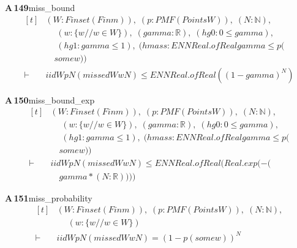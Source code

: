 \documentclass[conference]{IEEEtran}
\theoremstyle{definition}
\newcommand{\lean}[1]{\textsf{\footnotesize #1}}
\begin{document}
\noindent\textbf{A\,149}\quad\lean{miss\_bound}
{\footnotesize\[ \begin{aligned}[t]
&(\mathit{W} : \mathit{Finset} (\mathit{Fin} \mathit{m})),\; (\mathit{p} : \mathit{PMF} (\mathit{Points} \mathit{W})),\; (\mathit{N} : \mathbb{N} ),\\
&\quad \; (\mathit{w} : \{ \mathit{w} // \mathit{w} \in \mathit{W}\} ),\; (\mathit{gamma} : \mathbb{R} ),\; (\mathit{hg0} : 0 \leq \mathit{gamma}),\\
&\quad \; (\mathit{hg1} : \mathit{gamma} \leq 1),\; (\mathit{hmass} : \mathit{ENNReal}.\mathit{ofReal} \mathit{gamma} \leq \mathit{p} (\\
&\quad \mathit{some} \mathit{w}))\\
\vdash\;&\mathit{iid} \mathit{W} \mathit{p} \mathit{N} (\mathit{missed} \mathit{W} \mathit{w} \mathit{N}) \leq \mathit{ENNReal}.\mathit{ofReal} ((1-\mathit{gamma})^{\mathit{N}})
\end{aligned} \]}

\noindent\textbf{A\,150}\quad\lean{miss\_bound\_exp}
{\footnotesize\[ \begin{aligned}[t]
&(\mathit{W} : \mathit{Finset} (\mathit{Fin} \mathit{m})),\; (\mathit{p} : \mathit{PMF} (\mathit{Points} \mathit{W})),\; (\mathit{N} : \mathbb{N} ),\\
&\quad \; (\mathit{w} : \{ \mathit{w} // \mathit{w} \in \mathit{W}\} ),\; (\mathit{gamma} : \mathbb{R} ),\; (\mathit{hg0} : 0 \leq \mathit{gamma}),\\
&\quad \; (\mathit{hg1} : \mathit{gamma} \leq 1),\; (\mathit{hmass} : \mathit{ENNReal}.\mathit{ofReal} \mathit{gamma} \leq \mathit{p} (\\
&\quad \mathit{some} \mathit{w}))\\
\vdash\;&\mathit{iid} \mathit{W} \mathit{p} \mathit{N} (\mathit{missed} \mathit{W} \mathit{w} \mathit{N}) \leq \mathit{ENNReal}.\mathit{ofReal} (\mathit{Real}.\mathit{exp} (-(\\
&\quad \mathit{gamma}*(\mathit{N}:\mathbb{R} ))))
\end{aligned} \]}

\noindent\textbf{A\,151}\quad\lean{miss\_probability}
{\footnotesize\[ \begin{aligned}[t]
&(\mathit{W} : \mathit{Finset} (\mathit{Fin} \mathit{m})),\; (\mathit{p} : \mathit{PMF} (\mathit{Points} \mathit{W})),\; (\mathit{N} : \mathbb{N} ),\\
&\quad \; (\mathit{w} : \{ \mathit{w} // \mathit{w} \in \mathit{W}\} )\\
\vdash\;&\mathit{iid} \mathit{W} \mathit{p} \mathit{N} (\mathit{missed} \mathit{W} \mathit{w} \mathit{N}) = (1 - \mathit{p} (\mathit{some} \mathit{w}))^{\mathit{N}}
\end{aligned} \]}
\end{document}
